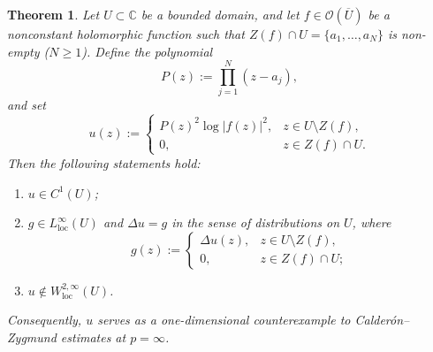 \documentclass[10pt,a4paper]{amsart}
\newtheorem{theorem}{Theorem}
\begin{document}
\begin{theorem}\label{Linfty}
Let $U \subset \mathbb{C}$ be a bounded domain, and let $f \in \mathcal{O}(\overline{U})$ be a nonconstant holomorphic function such that $Z(f) \cap U = \{a_1, \dots, a_N\}$ is non-empty ($N \ge 1$). Define the polynomial
\[
P(z) := \prod_{j=1}^N (z-a_j),
\]
and set
\[
u(z) :=
\begin{cases}
P(z)^2 \log |f(z)|^2, & z \in U \setminus Z(f),\\[4pt]
0, & z \in Z(f) \cap U.
\end{cases}
\]
Then the following statements hold:
\begin{enumerate}
    \item $u \in C^1(U)$;
    \item $g \in L^\infty_{\mathrm{loc}}(U)$ and $\Delta u = g$ in the sense of distributions on $U$, where
    \begin{equation}
    g(z) :=
    \begin{cases}
    \Delta u(z), & z \in U \setminus Z(f),\\[4pt]
    0, & z \in Z(f) \cap U;
    \end{cases}
    \end{equation}
    \item $u \notin W^{2,\infty}_{\mathrm{loc}}(U)$.
\end{enumerate}
Consequently, $u$ serves as a one-dimensional counterexample to Calder\'on--Zygmund estimates at $p = \infty$.
\end{theorem}
\end{document}

